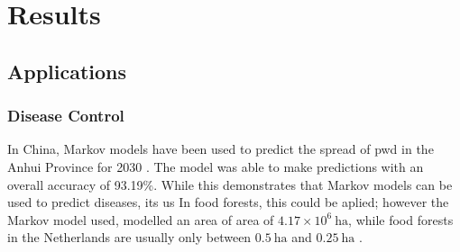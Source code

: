 \section{Results}

\subsection{Applications}

\subsubsection{Disease Control}

In China, Markov models have been used to predict the spread of \gls{pwd} in the Anhui Province for 2030 \parencite{liu2022occurrence}.
The model was able to make predictions with an overall accuracy of 93.19\%.
While this demonstrates that Markov models can be used to predict diseases, its us
In food forests, this could be aplied; however the Markov model used, modelled an area of area of $4.17 \times 10^6\:\text{ha}$, while food forests in the Netherlands are usually only between $0.5\:\text{ha}$ and $0.25\:\text{ha}$ \parencite{roodhof2024understanding}.

